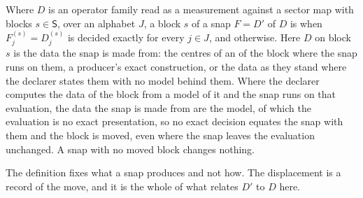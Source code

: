 \begin{definition}
Where $D$ is an operator family read as a measurement against a sector map
with blocks $s\in\mathsf{S}$, over an alphabet $J$, a block $s$ of a snap
$F=D'$ of $D$ is
 when
$F^{(s)}_j=D^{(s)}_j$ is decided exactly for every $j\in J$, and
 otherwise. Here $D$ on block $s$ is the data the snap is made
from: the centres of an  of the block where the snap
runs on them, a producer's exact construction, or the data as they stand
where the declarer states them with no model behind them. Where the
declarer computes the data of the block from a model of it and the snap
runs on that evaluation, the data the snap is made from are the model, of
which the evaluation is no exact presentation, so no exact decision equates
the snap with them and the block is moved, even where the snap leaves the
evaluation unchanged. A snap with no moved block changes nothing.

The definition fixes what a snap produces and not how. The displacement is a
record of the move, and it is the whole of what relates $D'$ to $D$ here.
\end{definition}
